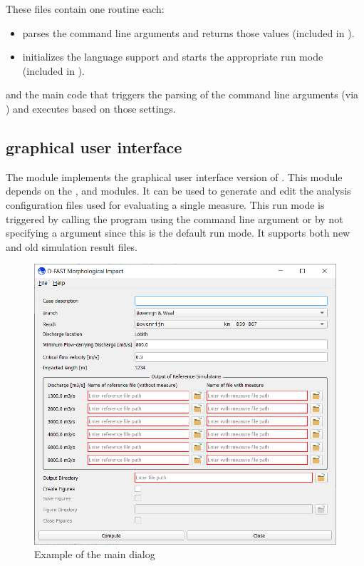 These files contain one routine each:

\begin{itemize}
\item {} parses the command line arguments and returns those values (included in ).
\item {} initializes the language support and starts the appropriate run mode (included in ).
\end{itemize}

and the main code that triggers the parsing of the command line arguments (via ) and executes  based on those settings.


\subsection{graphical user interface }

The  module implements the graphical user interface version of \dfastmi.
This module depends on the ,  and  modules.
It can be used to generate and edit the analysis configuration files used for evaluating a single measure.
This run mode is triggered by calling the program using the command line argument  or by not specifying a  argument since this is the default run mode.
It supports both new and old simulation result files.

\begin{figure}
\center
\includegraphics[width=12cm]{figures/main_dialog.png}
\caption{Example of the main dialog}
\end{figure}

